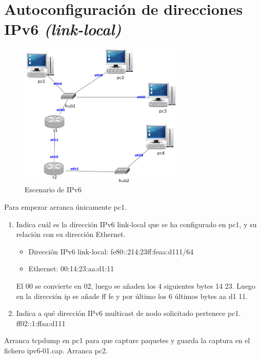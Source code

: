 \documentclass[12pt, a4paper]{report}
\begin{document}
\section{Autoconfiguración de direcciones IPv6 \textit{(link-local)}}
\begin{figure}[h]
	\centering
	\includegraphics[width=0.7\textwidth]{fig1}
	\caption{Escenario de IPv6}
\end{figure}
Para empezar arranca únicamente pc1.\\
\begin{enumerate}
	\item Indica cuál es la dirección IPv6 link-local que se ha configurado en pc1, y su relación con su
	dirección Ethernet.\\	
	\begin{itemize}
		\item Dirección IPv6 link-local: fe80::214:23ff:feaa:d111/64
		\item Ethernet: 00:14:23:aa:d1:11
	\end{itemize}
	El 00 se convierte en 02, luego se añaden los 4 siguientes bytes 14 23. Luego en la dirección ip se añade ff fe y por último los 6 últimos bytes aa d1 11.
	\item Indica a qué dirección IPv6 multicast de nodo solicitado pertenece pc1.\\
	ff02::1:ffaa:d111
\end{enumerate}
Arranca tcpdump en pc1 para que capture paquetes y guarda la captura en el fichero ipv6-01.cap.
Arranca pc2.\\
\end{document}
